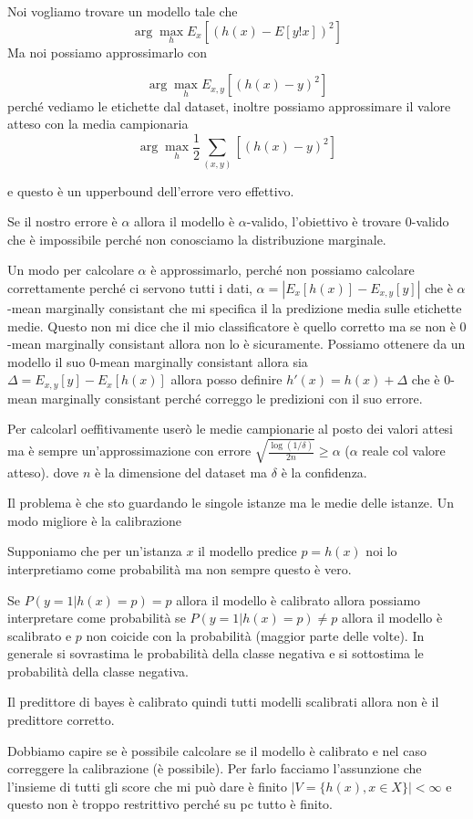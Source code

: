 Noi vogliamo trovare un modello tale che 
$$\arg\max_h E_x[(h(x)-E[y!x])^2]$$
Ma noi possiamo approssimarlo con 

$$\arg\max_h E_{x,y}[(h(x)-y)^2]$$
perché vediamo le etichette dal dataset, inoltre possiamo approssimare il valore atteso con la media campionaria
$$\arg\max_h \frac{1}{2}\sum_{(x,y)}[(h(x)-y)^2]$$

e questo è un upperbound dell'errore vero effettivo.

Se il nostro errore è $\alpha$ allora il modello è $\alpha$-valido, l'obiettivo è trovare $0$-valido che è impossibile perché non 
conosciamo la distribuzione marginale. 

Un modo per calcolare $\alpha$ è approssimarlo, perché non possiamo calcolare correttamente perché ci servono tutti i dati,
$\alpha = |E_x[h(x)]-E_{x,y}[y]|$ che è $\alpha$-mean marginally consistant che mi specifica il la predizione media sulle etichette medie.
Questo non mi dice che il mio classificatore è quello corretto ma se non è $0$-mean marginally consistant allora non lo è sicuramente.
Possiamo ottenere da un modello il suo $0$-mean marginally consistant  allora sia $\Delta = E_{x,y}[y]-E_x[h(x)]$ allora posso 
definire $h'(x) = h(x) +\Delta$ che è $0$-mean marginally consistant perché correggo le predizioni con il suo errore. 

Per calcolarl oeffitivamente userò le medie campionarie al posto dei valori attesi ma è sempre un'approssimazione con errore $\sqrt{\frac{\log(1/\delta)}{2n}}\ge \alpha$ ($\alpha$ reale col valore atteso).
dove $n$ è la dimensione del dataset ma $\delta$ è la confidenza.

Il problema è che sto guardando le singole istanze ma le medie delle istanze.
Un modo migliore è la calibrazione

Supponiamo che per un'istanza $x$ il modello predice $p=h(x)$ noi lo interpretiamo come probabilità ma non sempre questo è vero.

Se $P(y=1|h(x)=p)= p$ allora il modello è calibrato allora possiamo interpretare come probabilità se $P(y=1|h(x)=p)\ne p$ allora 
il modello è scalibrato e $p$ non coicide con la probabilità (maggior parte delle volte). In generale si sovrastima le probabilità della 
classe negativa e si sottostima le probabilità della classe negativa.

Il predittore di bayes è calibrato quindi tutti modelli scalibrati allora non è il predittore corretto.

Dobbiamo capire se è possibile calcolare se il modello è calibrato e nel caso correggere la calibrazione (è possibile). Per farlo facciamo 
l'assunzione che l'insieme di tutti gli score che mi può dare è finito $|V=\{h(x), x\in X\}|<\infty$ e questo non è troppo restrittivo perché
su pc tutto è finito.

